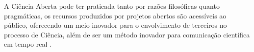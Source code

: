 A Ciência Aberta pode ter praticada tanto por razões filosóficas quanto
pragmáticas, os recursos produzidos por projetos abertos são acessíveis ao
público, oferecendo um meio inovador para o envolvimento de terceiros no
processo de Ciência, além de ser um método inovador para comunicação científica
em tempo real \cite{grand_open_2010}.


%
%
%
%
%
%
%

